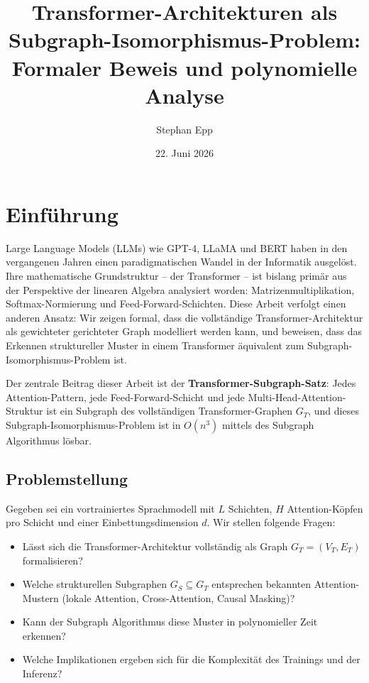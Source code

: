 ﻿\documentclass[a4paper,12pt]{article}
\title{Transformer-Architekturen als\\Subgraph-Isomorphismus-Problem:\\
Formaler Beweis und polynomielle Analyse}
\author{Stephan Epp}
\date{22. Juni 2026}
\theoremstyle{definition}
\begin{document}
\maketitle

\tableofcontents
\newpage

\section{Einführung}

Large Language Models (LLMs) wie GPT-4, LLaMA und BERT haben in den
vergangenen Jahren einen paradigmatischen Wandel in der Informatik ausgelöst.
Ihre mathematische Grundstruktur -- der Transformer -- ist bislang primär
aus der Perspektive der linearen Algebra analysiert worden: Matrizenmultiplikation,
Softmax-Normierung und Feed-Forward-Schichten. Diese Arbeit verfolgt
einen anderen Ansatz: Wir zeigen formal, dass die vollständige
Transformer-Architektur als gewichteter gerichteter Graph modelliert werden kann,
und beweisen, dass das Erkennen struktureller Muster in einem Transformer
äquivalent zum Subgraph-Isomorphismus-Problem ist.

Der zentrale Beitrag dieser Arbeit ist der \textbf{Transformer-Subgraph-Satz}:
Jedes Attention-Pattern, jede Feed-Forward-Schicht und jede Multi-Head-Attention-Struktur
ist ein Subgraph des vollständigen Transformer-Graphen $G_T$, und dieses Subgraph-Isomorphismus-Problem
ist in $O(n^3)$ mittels des Subgraph Algorithmus \cite{epp2026subgraph} lösbar.

\subsection{Problemstellung}

Gegeben sei ein vortrainiertes Sprachmodell mit $L$ Schichten, $H$ Attention-Köpfen
pro Schicht und einer Einbettungsdimension $d$. Wir stellen folgende Fragen:

\begin{itemize}
	\item Lässt sich die Transformer-Architektur vollständig als Graph $G_T = (V_T, E_T)$ formalisieren?
	\item Welche strukturellen Subgraphen $G_S \subseteq G_T$ entsprechen
	      bekannten Attention-Mustern (lokale Attention, Cross-Attention, Causal Masking)?
	\item Kann der Subgraph Algorithmus diese Muster in polynomieller Zeit erkennen?
	\item Welche Implikationen ergeben sich für die Komplexität des Trainings und der Inferenz?
\end{itemize}
\end{document}
